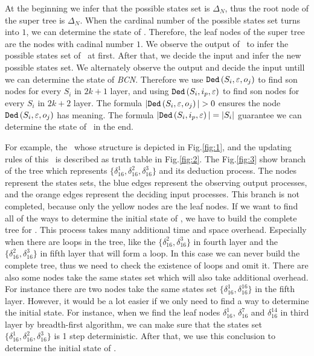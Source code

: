 At the beginning we infer that the possible states set is $\Delta_N$, thus the root node of the super tree is $\Delta_N$. When the cardinal number of the possible states set turns into $1$, we can determine the state of \BCN. Therefore, the leaf nodes of the super tree are the nodes with cadinal number $1$. We observe the output of \BCN\ to infer the possible states set of \BCN\ at first. After that, we decide the input and infer the new possible states set. We alternately observe the output and decide the input untill we can determine the state of {\em BCN}. Therefore we use ${\tt Ded}\left(S_i,\varepsilon, o_j\right)$ to find son nodes for every $S_i$ in $2k+1$ layer, and using ${\tt Ded}\left(S_i,i_p,\varepsilon\right)$ to find son nodes for every $S_i$ in $2k+2$ layer. The formula $|\Ded\left(S_i,\varepsilon, o_j\right)|>0$ ensures the node ${\tt Ded}\left(S_i,\varepsilon, o_j\right)$ has meaning. The formula $|{\tt Ded}\left(S_i,i_p,\varepsilon\right)|=|S_i|$ guarantee we can determine the state of \BCN\ in the end. 
\begin{example}
For example, the \BCN\ whose structure is depicted in Fig.\ref{fig:1}, and the updating rules of this \BCN\ is described as truth table in Fig.\ref{fig:2}. The Fig.\ref{fig:3} show branch of the tree which represents $\{\delta_{16}^1,\delta_{16}^2,\delta_{16}^3\}$ and its deduction process. The nodes represent the states sets, the blue edges represent the observing output processes, and the orange edges represent the deciding input processes. This branch is not completed, because only the yellow nodes are the leaf nodes. If we want to find all of the ways to determine the initial state of \BCN, we have to build the complete tree for \BCN. This process takes many additional time and space overhead. Especially when there are loops in the tree, like the $\{\delta_{16}^2,\delta_{16}^3\}$ in fourth layer and the $\{\delta_{16}^2,\delta_{16}^3\}$ in fifth layer that will form a loop. In this case we can never build the complete tree, thus we need to check the existence of loops and omit it. There are also some nodes take the same states set which will also take additional overhead. For instance there are two nodes take the same states set $\{\delta_{16}^1,\delta_{16}^{16}\}$ in the fifth layer. However, it would be a lot easier if we only need to find a way to determine the initial state. For instance, when we find the leaf nodes $\delta_{16}^1$, $\delta_{16}^7$ and  $\delta_{16}^{14}$ in third layer by breadth-first algorithm, we can make sure that the states set $\{\delta_{16}^1,\delta_{16}^2,\delta_{16}^3\}$ is 1 step deterministic. After that, we use this conclusion to determine the initial state of \BCN. 
\end{example}   
